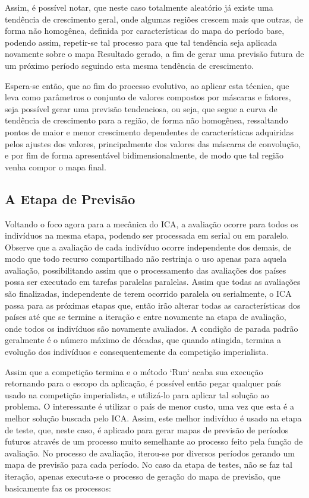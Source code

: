 Assim, é possível notar, que neste caso totalmente aleatório já existe uma tendência de crescimento geral, onde algumas regiões crescem mais que outras, de forma não homogênea, definida por características do mapa do período base, podendo assim, repetir-se tal processo para que tal tendência seja aplicada novamente sobre o mapa Resultado gerado, a fim de gerar uma previsão futura de um próximo período seguindo esta mesma tendência de crescimento. 

Espera-se então, que ao fim do processo evolutivo, ao aplicar esta técnica, que leva como parâmetros o conjunto de valores compostos por máscaras e fatores, seja possível gerar uma previsão tendenciosa, ou seja, que segue a curva de tendência de crescimento para a região, de forma não homogênea, ressaltando pontos de maior e menor crescimento dependentes de características adquiridas pelos ajustes dos valores, principalmente dos valores das máscaras de convolução, e por fim de forma apresentável bidimensionalmente, de modo que tal região venha compor o mapa final. 

\subsection{A Etapa de Previsão}
\label{A Etapa de Previsão}

Voltando o foco agora para a mecânica do ICA, a avaliação ocorre para todos os indivíduos na mesma etapa, podendo ser processada em serial ou em paralelo. Observe que a avaliação de cada indivíduo ocorre independente dos demais, de modo que todo recurso compartilhado não restrinja o uso apenas para aquela avaliação, possibilitando assim que o processamento das avaliações dos países possa ser executado em tarefas paralelas paralelas. Assim que todas as avaliações são finalizadas, independente de terem ocorrido paralela ou serialmente, o ICA passa para as próximas etapas que, então irão alterar todas as características dos países até que se termine a iteração e entre novamente na etapa de avaliação, onde todos os indivíduos são novamente avaliados. A condição de parada padrão geralmente é o número máximo de décadas, que quando atingida, termina a evolução dos indivíduos e consequentemente da competição imperialista. 

Assim que a competição termina e o método `Run` acaba sua execução retornando para o escopo da aplicação, é possível então pegar qualquer país usado na competição imperialista, e utilizá-lo para aplicar tal solução ao problema. O interessante é utilizar o país de menor custo, uma vez que esta é a melhor solução buscada pelo ICA. Assim, este melhor indivíduo é usado na etapa de teste, que, neste caso, é aplicado para gerar mapas de previsão de períodos futuros através de um processo muito semelhante ao processo feito pela função de avaliação. No processo de avaliação, iterou-se por diversos períodos gerando um mapa de previsão para cada período. No caso da etapa de testes, não se faz tal iteração, apenas executa-se o processo de geração do mapa de previsão, que basicamente faz os processos:

